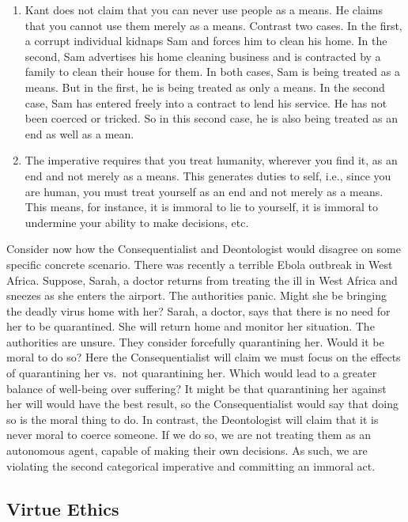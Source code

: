 \documentclass[9pt]{article}
\begin{document}
\begin{enumerate}
\def\labelenumi{\arabic{enumi}.}
\itemsep1pt\parskip0pt
\item
  Kant does not claim that you can never use people as a means. He
  claims that you cannot use them merely as a means. Contrast two cases.
  In the first, a corrupt individual kidnaps Sam and forces him to clean
  his home. In the second, Sam advertises his home cleaning business and
  is contracted by a family to clean their house for them. In both
  cases, Sam is being treated as a means. But in the first, he is being
  treated as only a means. In the second case, Sam has entered freely
  into a contract to lend his service. He has not been coerced or
  tricked. So in this second case, he is also being treated as an end as
  well as a mean.
\item
  The imperative requires that you treat humanity, wherever you find it,
  as an end and not merely as a means. This generates duties to self,
  i.e., since you are human, you must treat yourself as an end and not
  merely as a means. This means, for instance, it is immoral to lie to
  yourself, it is immoral to undermine your ability to make decisions,
  etc.
\end{enumerate}

Consider now how the Consequentialist and Deontologist would disagree on
some specific concrete scenario. There was recently a terrible Ebola
outbreak in West Africa. Suppose, Sarah, a doctor returns from treating
the ill in West Africa and sneezes as she enters the airport. The
authorities panic. Might she be bringing the deadly virus home with her?
Sarah, a doctor, says that there is no need for her to be quarantined.
She will return home and monitor her situation. The authorities are
unsure. They consider forcefully quarantining her. Would it be moral to
do so? Here the Consequentialist will claim we must focus on the effects
of quarantining her vs.~not quarantining her. Which would lead to a
greater balance of well-being over suffering? It might be that
quarantining her against her will would have the best result, so the
Consequentialist would say that doing so is the moral thing to do. In
contrast, the Deontologist will claim that it is never moral to coerce
someone. If we do so, we are not treating them as an autonomous agent,
capable of making their own decisions. As such, we are violating the
second categorical imperative and committing an immoral act.

\subsection{Virtue Ethics}\label{virtue-ethics}
\end{document}
